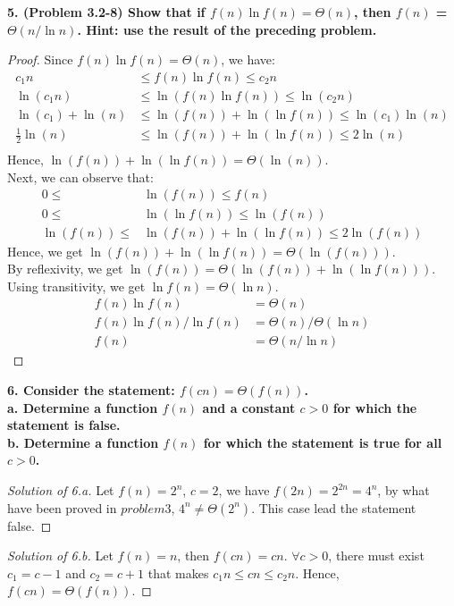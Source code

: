 \documentclass[12pt]{article}
\begin{document}
\noindent \textbf{5. (Problem 3.2-8) Show that if $f(n)\ln f(n) = \Theta(n)$, then $f(n)$ = $\Theta(n/\ln n)$. Hint: use the result of the preceding problem.}
\begin{proof}
	\cite{DK}Since $f(n)\ln f(n) = \Theta(n)$, we have:
	\begin{align*}
		c_1n&\le f(n)\ln f(n)\le c_2n\\
		\ln(c_1n)&\le \ln(f(n)\ln f(n))\le \ln(c_2n)\\
		\ln(c_1)+\ln(n)&\le\ln(f(n))+\ln (\ln f(n))\le \ln(c_1)\ln(n)\\
		\frac{1}{2}\ln(n)&\le\ln(f(n))+\ln (\ln f(n))\le 2\ln(n)\\
		\end{align*} 
	Hence, $\ln(f(n))+\ln (\ln f(n)) = \Theta(\ln(n))$.\\
	Next, we can observe that:
	\begin{align*}
		0\le&\ln(f(n))\le f(n)\\
		0\le&\ln (\ln f(n))\le\ln(f(n))\\
		\ln(f(n))\le&\ln(f(n))+\ln (\ln f(n))\le2\ln(f(n))
	\end{align*}
	Hence, we get $\ln(f(n))+\ln (\ln f(n))=\Theta(\ln(f(n)))$.\\
	By reflexivity, we get $\ln(f(n))=\Theta(\ln(f(n))+\ln (\ln f(n)))$. Using transitivity, we get $\ln f(n)=\Theta(\ln n)$.
	\begin{align*}
		f(n)\ln f(n) &= \Theta(n)\\
		f(n)\ln f(n) / \ln f(n) &= \Theta(n) / \Theta(\ln n)\\
		f(n)&=\Theta(n/\ln n)
	\end{align*}
\end{proof}

\noindent \textbf{6. Consider the statement: $f(cn) = \Theta(f(n))$.\\
	a. Determine a function $f(n)$ and a constant $c > 0$ for which the statement is false.\\
	b. Determine a function $f(n)$ for which the statement is true for all $c > 0$.}

\begin{proof}[Solution of 6.a]
	Let $f(n)=2^n$, $c=2$, we have $f(2n)=2^{2n}=4^n$, by what have been proved in $problem 3$, $4^n\ne\Theta(2^n)$. This case lead the statement false.
\end{proof}
\begin{proof}[Solution of 6.b]
	Let $f(n)=n$, then $f(cn)=cn$. $\forall c>0$, there must exist $c_1=c-1$ and $c_2=c+1$ that makes $c_1n\le cn\le c_2n$. Hence, $f(cn)=\Theta(f(n))$.
\end{proof}
\end{document}
